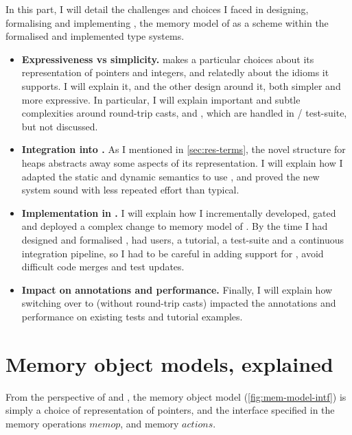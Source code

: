 In this part, I will detail the challenges and choices I faced in designing,
formalising and implementing , the memory model of  as a scheme
within the formalised and implemented type systems.
\begin{itemize}
    \item \textbf{Expressiveness vs simplicity.}  makes a particular
        choices about its representation of pointers and integers, and relatedly
        about the idioms it supports. I will explain it, and the other
        design around it, both simpler and more expressive. In particular,
        I will explain important and subtle complexities around round-trip casts,
         and , which are handled in
        / test-suite, but not discussed.
    \item \textbf{Integration into .} As I mentioned in
        \cref{sec:res-terms}, the novel structure for heaps abstracts away
        some aspects of its representation. I will explain how I adapted the
        static and dynamic semantics to use , and proved the new system
        sound with less repeated effort than typical.
    \item \textbf{Implementation in .} I will explain how I incrementally
        developed, gated and deployed a complex change to memory model of .
        By the time I had designed and formalised ,  had
        users, a tutorial, a test-suite and a continuous integration pipeline,
        so I had to be careful in adding support for , avoid difficult
        code merges and test updates.
    \item \textbf{Impact on annotations and performance.} Finally, I will explain
        how switching over to  (without round-trip casts) impacted
        the annotations and performance on existing  tests and tutorial
        examples.
\end{itemize}

\chapter{Memory object models, explained}\label{chap:mem-model-explained}

\margintoc%

From the perspective of  and , the memory object model
(\cref{fig:mem-model-intf}) is simply a choice of representation of pointers,
and the interface specified in the memory operations $memop$, and memory
$\mathit{actions}$.

